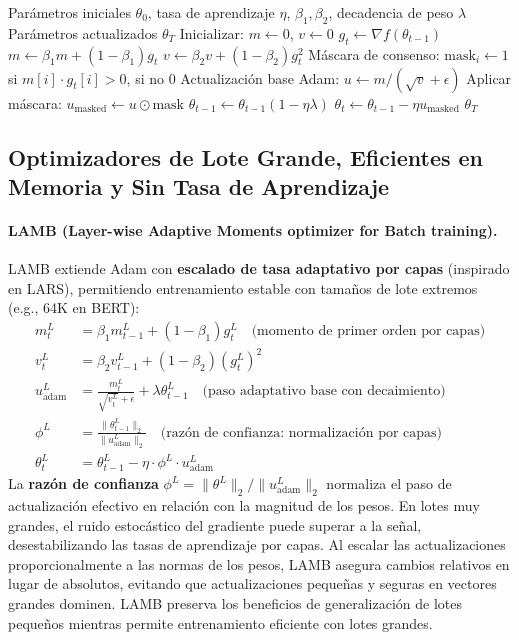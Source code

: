 \begin{algorithm}[H]
\caption{Cautious AdamW (Enmascaramiento de Actualización por Consenso)}
\label{alg:cautious}
\begin{algorithmic}[1]
\Require Parámetros iniciales $\theta_0$, tasa de aprendizaje $\eta$, $\beta_1, \beta_2$, decadencia de peso $\lambda$
\Ensure Parámetros actualizados $\theta_T$
\State Inicializar: $m \gets 0$, $v \gets 0$
    \State $g_t \gets \nabla f(\theta_{t-1})$
    \State $m \gets \beta_1 m + (1-\beta_1) g_t$
    \State $v \gets \beta_2 v + (1-\beta_2) g_t^2$
    \State Máscara de consenso: $\text{mask}_i \gets 1$ si $m[i] \cdot g_t[i] > 0$, si no $0$ 
    \State Actualización base Adam: $u \gets m / (\sqrt{v} + \epsilon)$
    \State Aplicar máscara: $u_{\text{masked}} \gets u \odot \text{mask}$ 
        \State $\theta_{t-1} \gets \theta_{t-1}(1 - \eta\lambda)$
    \EndIf
    \State $\theta_t \gets \theta_{t-1} - \eta u_{\text{masked}}$
\EndFor
\Return $\theta_T$
\end{algorithmic}
\end{algorithm}

\subsection{Optimizadores de Lote Grande, Eficientes en Memoria y Sin Tasa de Aprendizaje}
\paragraph{LAMB (Layer-wise Adaptive Moments optimizer for Batch training).}
LAMB extiende Adam con \textbf{escalado de tasa adaptativo por capas} (inspirado en LARS), permitiendo entrenamiento estable con tamaños de lote extremos (e.g., 64K en BERT):
\begin{align}
m_t^L &= \beta_1 m_{t-1}^L + (1-\beta_1)g_t^L \quad\text{(momento de primer orden por capas)} \\
v_t^L &= \beta_2 v_{t-1}^L + (1-\beta_2)(g_t^L)^2 \\
u_{\text{adam}}^L &= \frac{m_t^L}{\sqrt{v_t^L}+\epsilon} + \lambda\theta_{t-1}^L \quad\text{(paso adaptativo base con decaimiento)} \\
\phi^L &= \frac{\|\theta_{t-1}^L\|_2}{\|u_{\text{adam}}^L\|_2} \quad\text{(razón de confianza: normalización por capas)} \\
\theta_t^L &= \theta_{t-1}^L - \eta \cdot \phi^L \cdot u_{\text{adam}}^L
\end{align}
La \textbf{razón de confianza} $\phi^L = \|\theta^L\|_2 / \|u_{\text{adam}}^L\|_2$ normaliza el paso de actualización efectivo en relación con la magnitud de los pesos. En lotes muy grandes, el ruido estocástico del gradiente puede superar a la señal, desestabilizando las tasas de aprendizaje por capas. Al escalar las actualizaciones proporcionalmente a las normas de los pesos, LAMB asegura cambios relativos en lugar de absolutos, evitando que actualizaciones pequeñas y seguras en vectores grandes dominen. LAMB preserva los beneficios de generalización de lotes pequeños mientras permite entrenamiento eficiente con lotes grandes.

